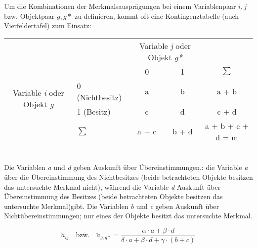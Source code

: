 Um die Kombinationen der Merkmalsausprägungen bei einem Variablenpaar $i,j$ bzw. Objektpaar $g,g*$ zu definieren, kommt oft eine Kontingenztabelle (auch Vierfeldertafel) zum Einsatz: \\

\begin{tabular}{cl|cc|c}
	& & \multicolumn{2}{c|}{Variable \textit{j} oder Objekt \textit{g*}} & \\ 
	& & 0 & 1 & $\sum$ \\ \hline
	\multirow{2}{*}{Variable \textit{i} oder Objekt \textit{g}} & 0 (Nichtbesitz) & a & b & a + b \\
	& 1 (Besitz) & c & d & c + d \\ \hline
	& $\sum$ & a + c & b + d & a + b + c + d = m \\ 
\end{tabular}
\bigskip
\\
Die Variablen \textit{a} und \textit{d} geben Auskunft über Übereinstimmungen.: die Variable \textit{a} über die Übereinstimmung des Nichtbesitzes (beide betrachteten Objekte besitzen das untersuchte Merkmal nicht), während die Variable \textit{d} Auskunft über Übereinstimmung des Besitzes (beide betrachteten Objekte besitzen das untersuchte Merkmal)gibt. Die Variablen \textit{b} und \textit{c} geben Auskunft über Nichtübereinstimmungen; nur eines der Objekte besitzt das untersuchte Merkmal.

\begin{equation}
\ddot{a}_{ij} \quad \text{bzw.} \quad \ddot{a}_{g,g*} = \frac{\alpha \cdot a + \beta \cdot d}{\delta \cdot a + \beta \cdot d + \gamma \cdot (b + c)}
\end{equation}

